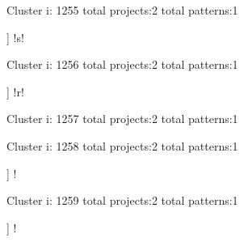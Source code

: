 Cluster i: 1255
total projects:2
total patterns:1
\begin{multicols}{1}
\begin{description}[noitemsep,topsep=0pt]
\item [[2] ] \cverb!s!
\end{description}
\end{multicols}







Cluster i: 1256
total projects:2
total patterns:1
\begin{multicols}{1}
\begin{description}[noitemsep,topsep=0pt]
\item [[2] ] \cverb!r!
\end{description}
\end{multicols}







Cluster i: 1257
total projects:2
total patterns:1
\begin{multicols}{1}
\end{multicols}







Cluster i: 1258
total projects:2
total patterns:1
\begin{multicols}{1}
\begin{description}[noitemsep,topsep=0pt]
\item [[2] ] \cverb!%
\end{description}
\end{multicols}







Cluster i: 1259
total projects:2
total patterns:1
\begin{multicols}{1}
\begin{description}[noitemsep,topsep=0pt]
\item [[2] ] \cverb!%
\end{description}
\end{multicols}







